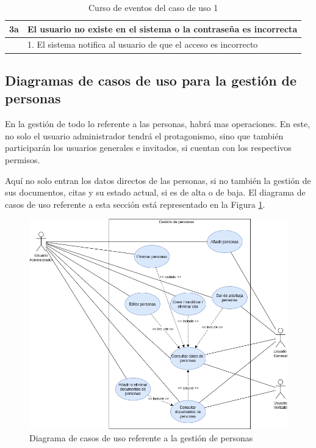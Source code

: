 \begin{table}[hp!]
{\begin{tabular}{|l|l|l|l|}
        \hline
        3a & \multicolumn{3}{l|}{ El usuario no existe en el sistema o la contraseña es incorrecta }                                                                                                                                          \\ 
        \hline
        & \multicolumn{3}{l|}{1. El sistema notifica al usuario de que el acceso es incorrecto}                                                                                                                                            \\
        \hline
        \end{tabular}
    }
    \caption{Curso de eventos del caso de uso 1}
\end{table}

\newpage

\subsection{Diagramas de casos de uso para la gestión de personas}

En la gestión de todo lo referente a las personas, habrá mas operaciones. En este, no solo el usuario administrador tendrá el protagonismo, sino que también participarán los usuarios generales e invitados, si cuentan con los respectivos permisos.

Aquí no solo entran los datos directos de las personas, si no también la gestión de sus documentos, citas y su estado actual, si es de alta o de baja. El diagrama de casos de uso referente a esta sección está representado en la Figura \ref{fig:cu_personas}. 

\begin{figure}[h!]
    \centering
    \includegraphics[width=1\linewidth]{diseno/sistema/CU/personas.png}
    \caption{Diagrama de casos de uso referente a la gestión de personas}
    \label{fig:cu_personas}
\end{figure}

